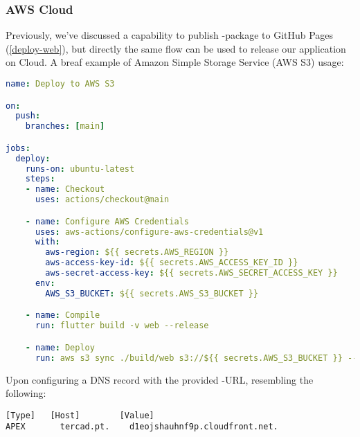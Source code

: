
\subsubsection{AWS Cloud}

Previously, we've discussed a capability to publish -package to GitHub Pages (\ref{deploy-web}), but 
directly the same flow can be used to release our application on Cloud. A breaf example of Amazon Simple Storage 
Service (AWS S3) usage:

\begin{lstlisting}[language=yaml]
name: Deploy to AWS S3

on: 
  push:
    branches: [main]

jobs:
  deploy:
    runs-on: ubuntu-latest
    steps:
    - name: Checkout
      uses: actions/checkout@main

    - name: Configure AWS Credentials
      uses: aws-actions/configure-aws-credentials@v1
      with:
        aws-region: ${{ secrets.AWS_REGION }}
        aws-access-key-id: ${{ secrets.AWS_ACCESS_KEY_ID }}
        aws-secret-access-key: ${{ secrets.AWS_SECRET_ACCESS_KEY }}
      env:
        AWS_S3_BUCKET: ${{ secrets.AWS_S3_BUCKET }}

    - name: Compile
      run: flutter build -v web --release

    - name: Deploy
      run: aws s3 sync ./build/web s3://${{ secrets.AWS_S3_BUCKET }} --delete
\end{lstlisting}

\noindent Upon configuring a DNS record with the provided -URL, resembling the following:

\begin{lstlisting}[language=terminal]
[Type]	 [Host]        [Value]
APEX	   tercad.pt.    d1eojshauhnf9p.cloudfront.net.
\end{lstlisting}
